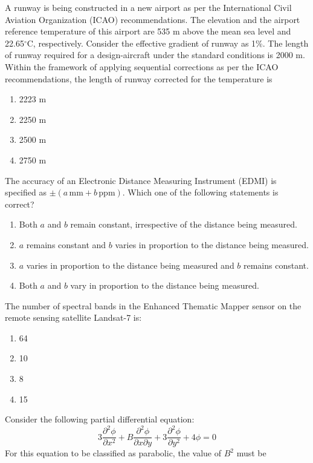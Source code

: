 \item A runway is being constructed in a new airport as per the International Civil Aviation Organization (ICAO) recommendations. The elevation and the airport reference temperature of this airport are 535 m above the mean sea level and 22.65$^\circ$C, respectively. Consider the effective gradient of runway as 1\%. The length of runway required for a design-aircraft under the standard conditions is 2000 m. Within the framework of applying sequential corrections as per the ICAO recommendations, the length of runway corrected for the temperature is
    \begin{enumerate}
        \item 2223 m
        \item 2250 m
        \item 2500 m
        \item 2750 m
    \end{enumerate}

\item The accuracy of an Electronic Distance Measuring Instrument (EDMI) is specified as $\pm (a \, \text{mm} + b \, \text{ppm})$. Which one of the following statements is correct?
    \begin{enumerate}
        \item Both $a$ and $b$ remain constant, irrespective of the distance being measured.
        \item $a$ remains constant and $b$ varies in proportion to the distance being measured.
        \item $a$ varies in proportion to the distance being measured and $b$ remains constant.
        \item Both $a$ and $b$ vary in proportion to the distance being measured.
    \end{enumerate}

\item The number of spectral bands in the Enhanced Thematic Mapper sensor on the remote sensing satellite Landsat-7 is:

\begin{enumerate}[label=(\Alph*)]
    \item 64
    \item 10
    \item 8
    \item 15
\end{enumerate}



\item Consider the following partial differential equation:
\[
3 \frac{\partial^2 \phi}{\partial x^2} + B \frac{\partial^2 \phi}{\partial x \partial y} + 3 \frac{\partial^2 \phi}{\partial y^2} + 4 \phi = 0
\]
For this equation to be classified as parabolic, the value of \( B^2 \) must be \underline{\hspace{2cm}}


